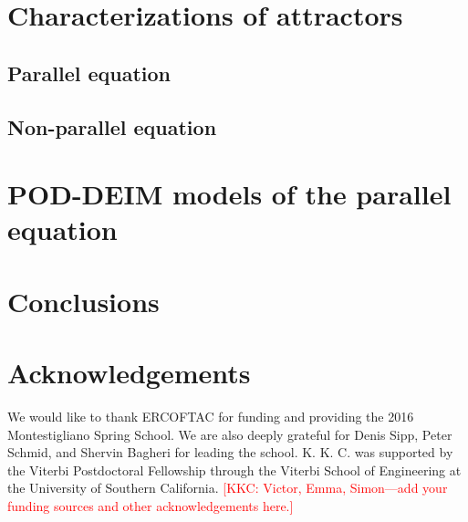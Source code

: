 \documentclass[11pt]{article}
\newcommand{\kkc}[1]{\textcolor{red}{[KKC: #1]}}
\begin{document}
\cite{WeidemanACMTMS00}
\cite{HechtJNM12}

\section{Characterizations of attractors}
\label{sec:attractors}

\subsection{Parallel equation}


\subsection{Non-parallel equation}

\section{POD-DEIM models of the parallel equation}
\label{sec:pod-deim}

\section{Conclusions}
\label{sec:conclusions}

\section{Acknowledgements}

We would like to thank ERCOFTAC for funding and providing the 2016 Montestigliano Spring School.
We are also deeply grateful for Denis Sipp, Peter Schmid, and Shervin Bagheri for leading the school.
K. K. C. was supported by the Viterbi Postdoctoral Fellowship through the Viterbi School of Engineering at the University of Southern California.
\kkc{Victor, Emma, Simon---add your funding sources and other acknowledgements here.}


\end{document}
